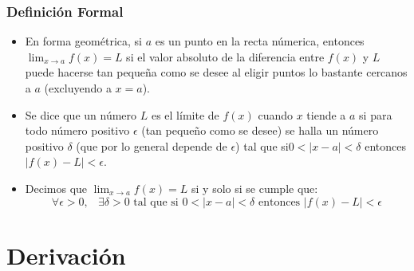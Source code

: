 \documentclass[12pt, fleqn]{report}                             %
\DeclareMathOperator \Space {\quad}                             %
\DeclareMathOperator \MiniSpace {\;}                            %
\begin{document}
            \subsection{Definición Formal}

                \begin{itemize}

                    \item
                        En forma geométrica, si $a$ es un punto en la recta númerica, entonces
                        $\lim_{x \to a} f(x) = L$ si el valor absoluto de la diferencia entre
                        $f(x)$ y $L$ puede hacerse tan pequeña como se desee al eligir puntos
                        lo bastante cercanos a $a$ (excluyendo a $x = a$).

                    \item
                        Se dice que un número $L$ es el límite de $f(x)$ cuando $x$ tiende a $a$
                        si para todo número positivo $\epsilon$ (tan pequeño como se desee) se
                        halla un número positivo $\delta$ (que por lo general depende de $\epsilon$)
                        tal que si$0 < |x - a| < \delta$ entonces $|f(x) - L| < \epsilon$.

                    \item 
                        Decimos que $\lim_{x \to a} f(x) = L$ si y solo si se cumple que:
                        \begin{equation*}
                            \forall \epsilon > 0, \MiniSpace
                                \exists \delta > 0 \text{ tal que si }
                                    0 < |x - a| < \delta \text{ entonces } |f(x) - L| < \epsilon 
                        \end{equation*}

                \end{itemize}

               


    \chapter{Derivación}
        \clearpage

        \clearpage
\end{document}
